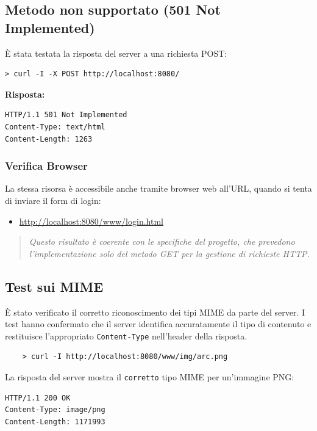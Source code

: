 \documentclass[a4paper,12pt]{report}
\begin{document}
\subsection{Metodo non supportato (501 Not Implemented)}
È stata testata la risposta del server a una richiesta POST:
\begin{verbatim}
> curl -I -X POST http://localhost:8080/
\end{verbatim}

\textbf{Risposta:}
\begin{verbatim}
HTTP/1.1 501 Not Implemented
Content-Type: text/html
Content-Length: 1263
\end{verbatim}

\subsubsection{Verifica Browser}
La stessa risorsa è accessibile anche tramite browser web all'URL, quando si tenta di inviare il form di login:
\begin{itemize}
    \item \url{http://localhost:8080/www/login.html}
\end{itemize}

\vspace{0.5cm}

\begin{quote}
    \textit{Questo risultato è coerente con le specifiche del progetto, che prevedono l'implementazione solo del metodo GET per
        la gestione di richieste HTTP.}
\end{quote}

\subsection{Test sui MIME}
È stato verificato il corretto riconoscimento dei tipi MIME da parte del server. I test hanno confermato che il server
identifica accuratamente il tipo di contenuto e restituisce l'appropriato \texttt{Content-Type} nell'header della risposta.

\begin{verbatim}
    > curl -I http://localhost:8080/www/img/arc.png
\end{verbatim}

\noindent La risposta del server mostra il \texttt{corretto} tipo MIME per un'immagine PNG:
\begin{verbatim}
HTTP/1.1 200 OK
Content-Type: image/png
Content-Length: 1171993
\end{verbatim}
\end{document}

